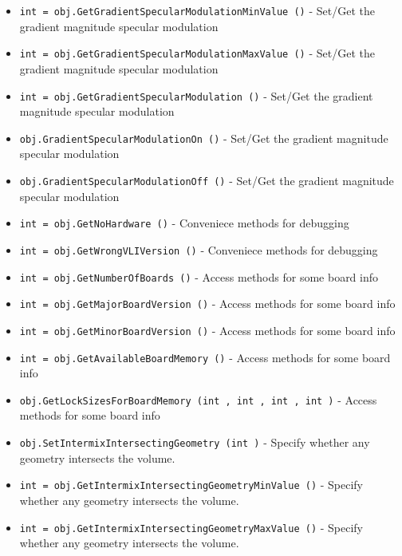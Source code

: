 \begin{itemize}
\item  \verb|int = obj.GetGradientSpecularModulationMinValue ()| -  Set/Get the gradient magnitude specular modulation 

\item  \verb|int = obj.GetGradientSpecularModulationMaxValue ()| -  Set/Get the gradient magnitude specular modulation 

\item  \verb|int = obj.GetGradientSpecularModulation ()| -  Set/Get the gradient magnitude specular modulation 

\item  \verb|obj.GradientSpecularModulationOn ()| -  Set/Get the gradient magnitude specular modulation 

\item  \verb|obj.GradientSpecularModulationOff ()| -  Set/Get the gradient magnitude specular modulation 

\item  \verb|int = obj.GetNoHardware ()| -  Conveniece methods for debugging

\item  \verb|int = obj.GetWrongVLIVersion ()| -  Conveniece methods for debugging

\item  \verb|int = obj.GetNumberOfBoards ()| -  Access methods for some board info

\item  \verb|int = obj.GetMajorBoardVersion ()| -  Access methods for some board info

\item  \verb|int = obj.GetMinorBoardVersion ()| -  Access methods for some board info

\item  \verb|int = obj.GetAvailableBoardMemory ()| -  Access methods for some board info

\item  \verb|obj.GetLockSizesForBoardMemory (int , int , int , int )| -  Access methods for some board info

\item  \verb|obj.SetIntermixIntersectingGeometry (int )| -  Specify whether any geometry intersects the volume.

\item  \verb|int = obj.GetIntermixIntersectingGeometryMinValue ()| -  Specify whether any geometry intersects the volume.

\item  \verb|int = obj.GetIntermixIntersectingGeometryMaxValue ()| -  Specify whether any geometry intersects the volume.


\end{itemize}

